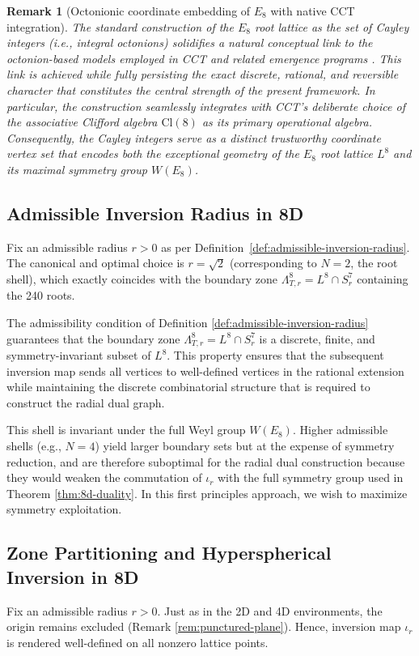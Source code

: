 \documentclass{article}
\newtheorem{remark}{Remark}
\begin{document}
\begin{remark}[Octonionic coordinate embedding of $E_8$ with native CCT integration]
\label{rem:cayley-cct-alignment}
The standard construction of the $E_8$ root lattice as the set of Cayley integers (i.e., integral octonions) solidifies a natural conceptual link to the octonion-based models employed in CCT and related emergence programs \cite{Dixon1994,Furey2016}. This link is achieved while fully persisting the exact discrete, rational, and reversible character that constitutes the central strength of the present framework. In particular, the construction seamlessly integrates with CCT’s deliberate choice of the associative Clifford algebra $\mathrm{Cl}(8)$ as its primary operational algebra. Consequently, the Cayley integers serve as a distinct trustworthy coordinate vertex set that encodes both the exceptional geometry of the $E_8$ root lattice $L^8$ and its maximal symmetry group $W(E_8)$.
\end{remark}

\subsection{Admissible Inversion Radius in 8D}
\label{subsec:8d-admissible-inversion-radius}
Fix an admissible radius $r > 0$ as per Definition~\ref{def:admissible-inversion-radius}. The canonical and optimal choice is $r = \sqrt{2}$ (corresponding to $N = 2$, the root shell), which exactly coincides with the boundary zone $\Lambda_{T,r}^8 = L^8 \cap S_r^7$ containing the 240 roots.

The admissibility condition of Definition \ref{def:admissible-inversion-radius} guarantees that the boundary zone $\Lambda_{T,r}^8 = L^8 \cap S_r^7$ is a discrete, finite, and symmetry-invariant subset of $L^8$. This property ensures that the subsequent inversion map sends all vertices to well-defined vertices in the rational extension while maintaining the discrete combinatorial structure that is required to construct the radial dual graph.

This shell is invariant under the full Weyl group $W(E_8)$. Higher admissible shells (e.g., $N=4$) yield larger boundary sets but at the expense of symmetry reduction, and are therefore suboptimal for the radial dual construction because they would weaken the commutation of \(\iota_r\) with the full symmetry group used in Theorem \ref{thm:8d-duality}. In this first principles approach, we wish to maximize symmetry exploitation.

\subsection{Zone Partitioning and Hyperspherical Inversion in 8D}
\label{subsec:8d-zone-partitioning}
Fix an admissible radius $r > 0$. Just as in the 2D and 4D environments, the origin remains excluded (Remark \ref{rem:punctured-plane}). Hence, inversion map $\iota_r$ is rendered well-defined on all nonzero lattice points.
\end{document}
